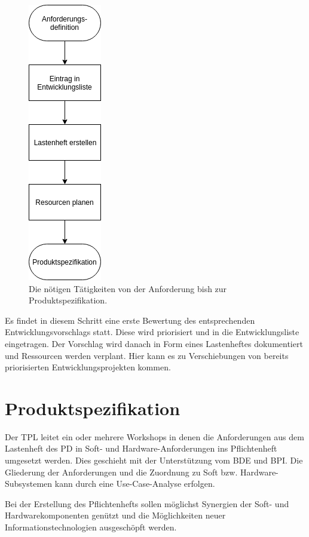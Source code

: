 \begin{figure}[h]
  \centering
  \includegraphics[keepaspectratio,height=0.8\textwidth]{images/3_2_1_1_Anforderungsdefinition_redraw.png}
  \caption[Anforderungsdefinition bis Produktspezifikation]{Die nötigen Tätigkeiten von der Anforderung bish zur Produktspezifikation.}
  \label{fig:Anforderungsdefinition}
\end{figure}

Es findet in diesem Schritt eine erste Bewertung des entsprechenden Entwicklungsvorschlags statt. Diese wird priorisiert und in die Entwicklungsliste eingetragen. Der Vorschlag wird danach in Form eines Lastenheftes dokumentiert und Ressourcen werden verplant. Hier kann es zu Verschiebungen von bereits priorisierten Entwicklungsprojekten kommen.

\section{Produktspezifikation}

Der \ac{TPL} leitet ein oder mehrere Workshops in denen die Anforderungen aus dem Lastenheft des \ac{PD} in Soft- und Hardware-Anforderungen ins Pflichtenheft umgesetzt werden. Dies geschieht mit der Unterstützung vom \ac{BDE} und \ac{BPI}. Die Gliederung der Anforderungen und die Zuordnung zu Soft bzw. Hardware-Subsystemen kann durch eine Use-Case-Analyse erfolgen.

Bei der Erstellung des Pflichtenhefts sollen möglichst Synergien der Soft- und Hardwarekomponenten genützt und die Möglichkeiten neuer Informationstechnologien ausgeschöpft werden. 

